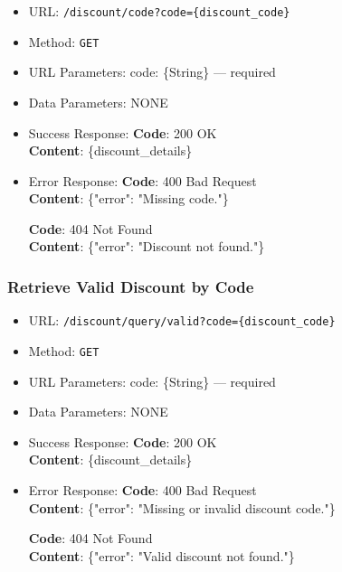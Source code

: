 \begin{itemize}
    \item URL: \texttt{/discount/code?code=\{discount\_code\}}
    \item Method: \texttt{GET}
    \item URL Parameters: code: \{String\} — required
    \item Data Parameters: NONE

    \item Success Response: \newline
    \textbf{Code}: 200 OK \\
    \textbf{Content}: \{discount\_details\}

    \item Error Response: \newline
    \textbf{Code}: 400 Bad Request \\
    \textbf{Content}: \{"error": "Missing code."\}

    \textbf{Code}: 404 Not Found \\
    \textbf{Content}: \{"error": "Discount not found."\}
\end{itemize}

\subsubsection*{Retrieve Valid Discount by Code}

\begin{itemize}
    \item URL: \texttt{/discount/query/valid?code=\{discount\_code\}}
    \item Method: \texttt{GET}
    \item URL Parameters: code: \{String\} — required
    \item Data Parameters: NONE

    \item Success Response: \newline
    \textbf{Code}: 200 OK \\
    \textbf{Content}: \{discount\_details\}

    \item Error Response: \newline
    \textbf{Code}: 400 Bad Request \\
    \textbf{Content}: \{"error": "Missing or invalid discount code."\}

    \textbf{Code}: 404 Not Found \\
    \textbf{Content}: \{"error": "Valid discount not found."\}
\end{itemize}

